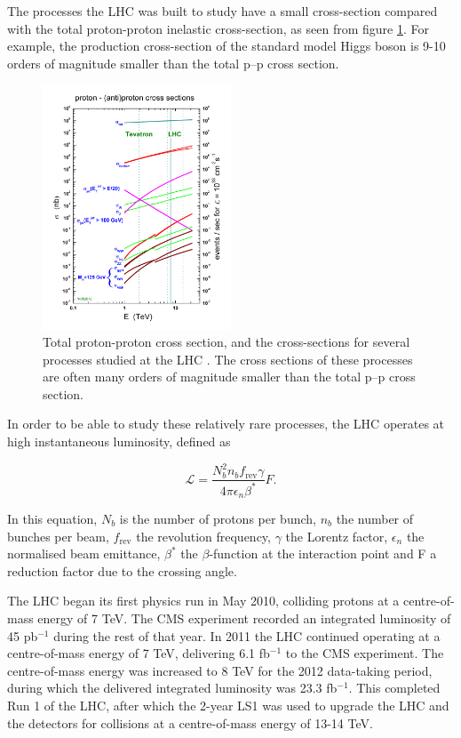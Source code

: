 The processes the \ac{LHC} was built to study have a small cross-section
compared with the total proton-proton inelastic cross-section, as seen from figure
\ref{fig:stirling_xs}. For example, the production cross-section of the
standard model Higgs boson is 9-10 orders of magnitude smaller than the total p--p cross section.

\begin{figure}[h!]
\includegraphics[width=0.5\textwidth]{./Detector/Plots/crosssections2013.jpg}
\caption{Total proton-proton cross section, and the cross-sections
for several processes studied at the LHC \cite{stirling-crosssection}.
The cross sections of these processes
are often many orders of magnitude smaller than the total p--p cross section.}
\label{fig:stirling_xs}
\end{figure}

In order to be able to study these relatively rare processes, 
the LHC operates at high instantaneous luminosity, defined as

\begin{equation}\label{eqn:CMSLHC_luminosity}
\mathcal{L} = \frac{N_b^2n_bf_{\text{rev}}\gamma}{4\pi\epsilon_n\beta^{*}}F.
\end{equation}

In this equation, $N_b$ is the number of protons per bunch, $n_b$ the number of
bunches per beam, $f_{\text{rev}}$ the revolution frequency, $\gamma$ the 
Lorentz factor, $\epsilon_n$ the normalised beam
emittance, $\beta^{*}$ the $\beta$-function at the interaction point and F a reduction
factor due to the crossing angle. 

The \ac{LHC} began its first physics run in May 2010, colliding protons at
a centre-of-mass energy of 7 TeV. The \ac{CMS} experiment recorded an integrated luminosity of 45 pb$^{-1}$
during the rest of that year. In 2011 the \ac{LHC} continued operating at a centre-of-mass energy of 7 TeV, delivering
6.1 fb$^{-1}$ to the \ac{CMS} experiment. The centre-of-mass energy was increased to 8 TeV
for the 2012 data-taking period, during which the delivered integrated luminosity was 23.3 fb$^{-1}$.
This completed Run 1 of the \ac{LHC}, after which the 2-year \ac{LS1} was used to 
upgrade the \ac{LHC} and the detectors for collisions at a centre-of-mass energy of 13-14 TeV.

